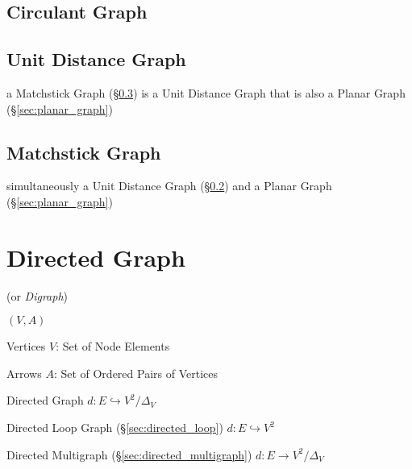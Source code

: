 \subsection{Circulant Graph}\label{sec:circulant_graph}

\subsection{Unit Distance Graph}\label{sec:unit_distance_graph}

a Matchstick Graph (\S\ref{sec:matchstick_graph}) is a Unit Distance Graph that
is also a Planar Graph (\S\ref{sec:planar_graph})



\subsection{Matchstick Graph}\label{sec:matchstick_graph}

simultaneously a Unit Distance Graph (\S\ref{sec:unit_distance_graph}) and a
Planar Graph (\S\ref{sec:planar_graph})



\section{Directed Graph}\label{sec:directed_graph}

(or \emph{Digraph})

$(V,A)$

Vertices $V$: Set of Node Elements

Arrows $A$: Set of Ordered Pairs of Vertices

Directed Graph
$d : E \hookrightarrow V^2 / \Delta_V$

Directed Loop Graph (\S\ref{sec:directed_loop}) $d : E \hookrightarrow
V^2$

Directed Multigraph (\S\ref{sec:directed_multigraph}) $d : E
\rightarrow V^2 / \Delta_V$

